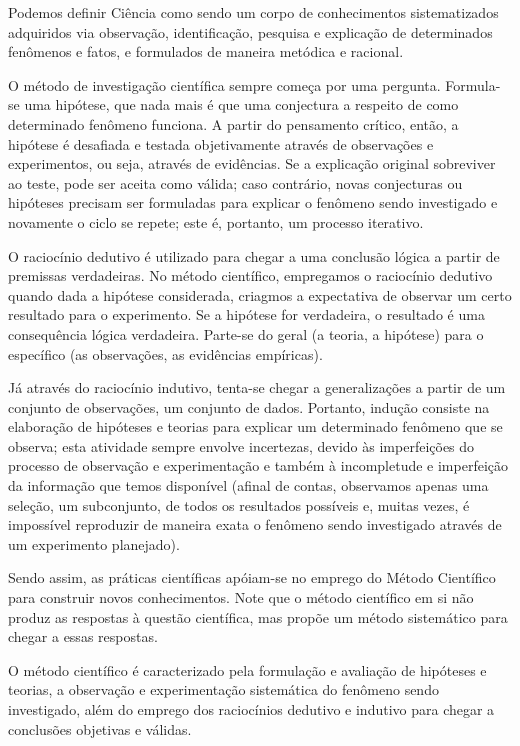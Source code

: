 \documentclass[
]{book}
\theoremstyle{definition}
\theoremstyle{definition}
\theoremstyle{definition}
\theoremstyle{remark}
\begin{document}
Podemos definir Ciência como sendo um corpo de conhecimentos sistematizados adquiridos via observação, identificação, pesquisa e explicação de determinados fenômenos e fatos, e formulados de maneira metódica e racional.

O método de investigação científica sempre começa por uma pergunta. Formula-se uma hipótese, que nada mais é que uma conjectura a respeito de como determinado fenômeno funciona. A partir do pensamento crítico, então, a hipótese é desafiada e testada objetivamente através de observações e experimentos, ou seja, através de evidências. Se a explicação original sobreviver ao teste, pode ser aceita como válida; caso contrário, novas conjecturas ou hipóteses precisam ser formuladas para explicar o fenômeno sendo investigado e novamente o ciclo se repete; este é, portanto, um processo iterativo.

O raciocínio dedutivo é utilizado para chegar a uma conclusão lógica a partir de premissas verdadeiras. No método científico, empregamos o raciocínio dedutivo quando dada a hipótese considerada, criagmos a expectativa de observar um certo resultado para o experimento. Se a hipótese for verdadeira, o resultado é uma consequência lógica verdadeira. Parte-se do geral (a teoria, a hipótese) para o específico (as observações, as evidências empíricas).

Já através do raciocínio indutivo, tenta-se chegar a generalizações a partir de um conjunto de observações, um conjunto de dados. Portanto, indução consiste na elaboração de hipóteses e teorias para explicar um determinado fenômeno que se observa; esta atividade sempre envolve incertezas, devido às imperfeições do processo de observação e experimentação e também à incompletude e imperfeição da informação que temos disponível (afinal de contas, observamos apenas uma seleção, um subconjunto, de todos os resultados possíveis e, muitas vezes, é impossível reproduzir de maneira exata o fenômeno sendo investigado através de um experimento planejado).

Sendo assim, as práticas científicas apóiam-se no emprego do Método Científico para construir novos conhecimentos. Note que o método científico em si não produz as respostas à questão científica, mas propõe um método sistemático para chegar a essas respostas.

O método científico é caracterizado pela formulação e avaliação de hipóteses e teorias, a observação e experimentação sistemática do fenômeno sendo investigado, além do emprego dos raciocínios dedutivo e indutivo para chegar a conclusões objetivas e válidas.
\end{document}
